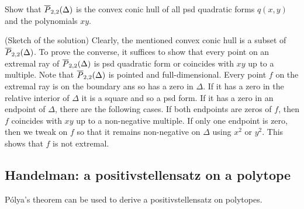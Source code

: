 
\begin{exercise}
	\label{ex:polya:P22decomposition}
Show that $\overline{P}_{2,2}(\Delta)$ is the convex conic hull of all psd quadratic forms $q(x,y)$ and the polynomials $xy$.
\end{exercise}

\begin{solution}	
(Sketch of the solution)
%
Clearly, the mentioned convex conic hull is a subset of $\overline{P}_{2,2}(\Delta)$. To prove the converse, it suffices to show that every point on an extremal ray of $\overline{P}_{2,2}(\Delta)$ is psd quadratic form or coincides with $xy$ up to a multiple. Note that $\overline{P}_{2,2}(\Delta)$ is pointed and full-dimensional. Every point $f$ on the extremal ray is on the boundary ans so has a zero in $\Delta$. If it has a zero in the relative interior of $\Delta$ it is a square and so a psd form. If it has a zero in an endpoint of $\Delta$, there are the following cases. If both endpoints are zeros of $f$, then $f$ coincides with $xy$ up to a non-negative multiple. If only one endpoint is zero, then we tweak on $f$ so that it remains non-negative on $\Delta$ using $x^2$ or $y^2$. This shows that $f$ is not extremal.
\end{solution}


\subsection{Handelman: a positivstellensatz on a polytope} 

P\'olya's theorem can be used to derive a positivstellensatz on polytopes.

